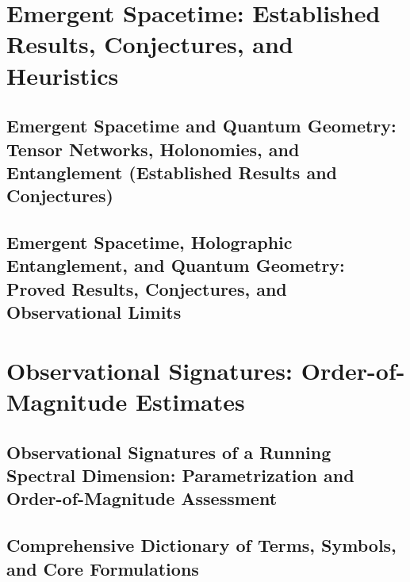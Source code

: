 \documentclass[11pt,a4paper,openright,twoside]{book}
\begin{document}
\part{Emergent Spacetime: Established Results, Conjectures, and Heuristics}

\chapter[Emergent Spacetime and Quantum Geometry: Tensor Networks, Holo\-no\-mies, and Entanglement (Established Results and Conjectures)]{Emergent Spacetime and Quantum Geometry: Tensor Networks, Holonomies, and Entanglement (Established Results and Conjectures)}


\chapter{Emergent Spacetime, Holographic Entanglement, and Quantum Geometry: Proved Results, Conjectures, and Observational Limits}


\part{Observational Signatures: Order-of-Magnitude Estimates}

\chapter{Observational Signatures of a Running Spectral Dimension: Parametrization and Order-of-Magnitude Assessment}


\backmatter

\chapter[Comprehensive Dictionary of Terms, Symbols, and Core Formulations]{Comprehensive Dictionary of Terms, Symbols, and Core Formulations}



\end{document}
